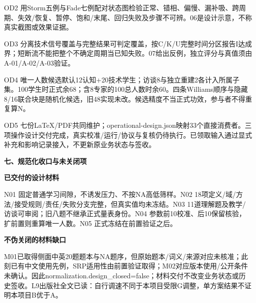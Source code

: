 \documentclass[11pt,a4paper]{article}
\newcommand{\reviewsection}[1]{\par\Needspace{9\baselineskip}\vspace{10pt}\begin{center}{\titlelatin\titlecjk\bfseries\fontsize{14}{20}\selectfont #1}\end{center}}
\newcommand{\reviewsubsection}[1]{\par\Needspace{4\baselineskip}\vspace{4pt}\begin{center}{\titlelatin\titlecjk\bfseries\fontsize{12}{18}\selectfont #1}\end{center}}
\begin{document}
OD2 用Storm五例与Fade七例配对状态图检验正常、错相、偏慢、漏补吸、跨周期、失效/恢复、暂停、饱和/末尾、回归失败及步骤不可辨。06是设计示意，不称真实截图或效果证据。

OD3 分离技术信号覆盖与完整结果可判定覆盖，按C/K/U完整时间分区报告I达成界；短断流不能把整个不确定周期当已知失败。07给出反例，独立评分与真值须由A-01/A-02/A-03验证。

OD4 唯一人数候选默认12认知+20技术学生；访谈8与独立重建2各计入所属子集。100学生时正式余68；含8专家的100总人数时余60。四条Williams顺序与隐藏8/16联合块是随机化候选，旧48实现未改。候选精度不当正式功效，参与者不得重复算N。

OD5 七份LaTeX/PDF共同维护；operational-design.json映射33个直接消费者。三项操作设计交付完成，真实校准/运行/协议与复核仍待执行。已领取输入通过显式补充和影响记录接入，不更新原业务状态与签收。

\newpage\reviewsection{七、规范化收口与未关闭项}
\reviewsubsection{7.1 已交付的设计材料}
N01 固定普通学习间隙，不诱发压力、不按NA高低筛样。N02 18项定义/\allowbreak{}域/\allowbreak{}方法/\allowbreak{}接受规则/\allowbreak{}责任/\allowbreak{}失败分支完整，但真实值均未冻结。N03 11道理解题及教学/\allowbreak{}访谈可审阅；旧八题不继承正式量表身份。N04 参数前10校准、后10保留核验，扩前置则重算唯一人数。N05 正式冻结在前置验证之后。

\reviewsubsection{7.2 不伪关闭的材料缺口}
M01已取得侧面中英20题题本与NA题序，但原始题本/词义/来源对应未核准；此刻已有中文使用先例，SRP适用性由前置验证取得；M02对应版本使用/公开条件未确认。因此normalization.design\_\allowbreak{}closed=false；材料交付不改变业务状态或历史签收。L9出版社全文已读：自行调速不同于本项目受限G调整，单方案结果不证明本项目B优于A。
\end{document}
